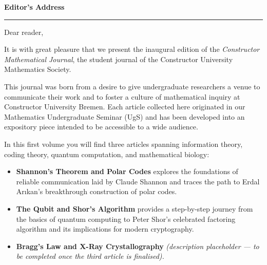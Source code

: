 \clearpage
\thispagestyle{frontmatter}

\vspace*{0.5cm}

\begin{center}
  {\LARGE\bfseries\color{cujblue}Editor's Address}\label{art:address}
\end{center}

\vspace{0.3cm}
\noindent\textcolor{cujgold}{\rule{\textwidth}{1.2pt}}
\vspace{0.3cm}

\noindent Dear reader,

\vspace{0.25cm}

It is with great pleasure that we present the inaugural edition of the
\textit{Constructor Mathematical Journal}, the student journal of the
Constructor University Mathematics Society.

\vspace{0.25cm}

This journal was born from a desire to give undergraduate researchers a venue
to communicate their work and to foster a culture of mathematical inquiry at
Constructor University Bremen. Each article collected here originated in our
Mathematics Undergraduate Seminar (UgS) and has been developed into an expository
piece intended to be accessible to a wide audience.

\vspace{0.25cm}

In this first volume you will find three articles spanning information theory,
coding theory, quantum computation, and mathematical biology:

\begin{itemize}[leftmargin=1.5em, itemsep=0.3em]
  \item \textbf{Shannon's Theorem and Polar Codes} explores the foundations
        of reliable communication laid by Claude Shannon and traces the path
        to Erdal Ar{\i}kan's breakthrough construction of polar codes.
  \item \textbf{The Qubit and Shor's Algorithm} provides a step-by-step
        journey from the basics of quantum computing to Peter Shor's
        celebrated factoring algorithm and its implications for modern
        cryptography.
  \item \textbf{Bragg's Law and X-Ray Crystallography} \textit{(description
        placeholder --- to be completed once the third article is finalised).}
\end{itemize}

